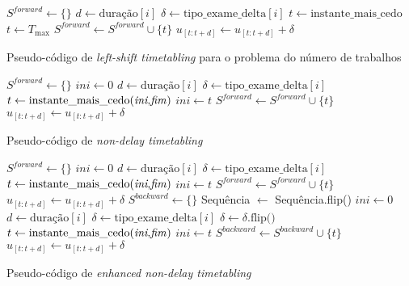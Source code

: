 \begin{algorithm}[H]
    $S^{\textit{forward}} \gets \{\}$\;
    {
        $d \gets \text{duração}[i]$\;
        $\delta \gets \text{tipo\_exame\_delta}[i]$\;
        $t \gets \text{instante\_mais\_cedo}$\;
		{
			$t \gets T_{\max}$
		}
        $S^{\textit{forward}} \gets S^{\textit{forward}} \cup \{t\}$\;
        $u_{[t: t+d]} \gets u_{[t: t+d]} + \delta$\;
    }
    \caption{Pseudo-código de \textit{left-shift timetabling} para o problema do número de trabalhos}
    \label{algo:left-shift-TT_P2}
\end{algorithm}

\begin{algorithm}[H]
    $S^{\textit{forward}} \gets \{\}$\;
    $\textit{ini} \gets 0$\;
    {
        $d \gets \text{duração}[i]$\;
        $\delta \gets \text{tipo\_exame\_delta}[i]$\;
        $t \gets \text{instante\_mais\_cedo(\textit{ini},\textit{fim})}$\;
        $\textit{ini} \gets t$\;
        $S^{\textit{forward}} \gets S^{\textit{forward}} \cup \{t\}$\;
        $u_{[t: t+d]} \gets u_{[t: t+d]} + \delta$\;
    }
    \caption{Pseudo-código de \textit{non-delay timetabling}}
    \label{algo:non-delay-TT_P2}
\end{algorithm}

\begin{algorithm}[H]
    $S^{\textit{forward}} \gets \{\}$\;
    $\textit{ini} \gets 0$\;
    {
        $d \gets \text{duração}[i]$\;
        $\delta \gets \text{tipo\_exame\_delta}[i]$\;
        $t \gets \text{instante\_mais\_cedo(\textit{ini},\textit{fim})}$\;
        $\textit{ini} \gets t$\;
        $S^{\textit{forward}} \gets S^{\textit{forward}} \cup \{t\}$\;
        $u_{[t: t+d]} \gets u_{[t: t+d]} + \delta$\;
    }
    $S^{\textit{backward}} \gets \{\}$\;
    Sequência $\gets$ Sequência.flip()\;
    $\textit{ini} \gets 0$\;
	{
        $d \gets \text{duração}[i]$\;
        $\delta \gets \text{tipo\_exame\_delta}[i]$\;
        $\delta \gets \delta\text{.flip()}$\;
        $t \gets \text{instante\_mais\_cedo(\textit{ini},\textit{fim})}$\;
        $\textit{ini} \gets t$\;
        $S^{\textit{backward}} \gets S^{\textit{backward}} \cup \{t\}$\;
        $u_{[t: t+d]} \gets u_{[t: t+d]} + \delta$\;
    }
    \caption{Pseudo-código de \textit{enhanced non-delay timetabling}}
    \label{algo:enh-non-delay-TT_P2}
\end{algorithm}
